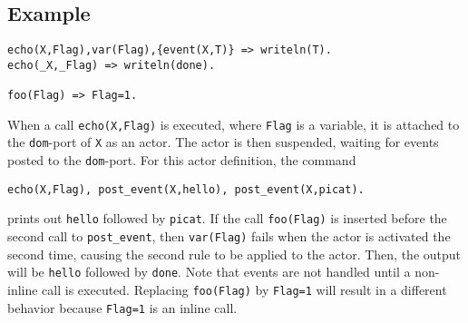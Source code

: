 \subsection*{Example}
\begin{verbatim}
echo(X,Flag),var(Flag),{event(X,T)} => writeln(T).
echo(_X,_Flag) => writeln(done).

foo(Flag) => Flag=1.
\end{verbatim}
When a call \texttt{echo(X,Flag)} is executed, where \texttt{Flag} is a variable, it is attached to the \texttt{dom}-port of \texttt{X} as an actor.  The actor is then suspended, waiting for events posted to the \texttt{dom}-port. For this actor definition, the command
\begin{small}
\begin{verbatim}
echo(X,Flag), post_event(X,hello), post_event(X,picat).
\end{verbatim}
\end{small}
prints out \texttt{hello} followed by \texttt{picat}. If the call \texttt{foo(Flag)} is inserted before the second call to \texttt{post\_event}, then \texttt{var(Flag)} fails when the actor is activated the second time, causing the second rule to be applied to the actor. Then, the output will be \texttt{hello} followed by \texttt{done}. Note that events are not handled until a non-inline call is executed. Replacing \texttt{foo(Flag)} by \texttt{Flag=1} will result in a different behavior because \texttt{Flag=1} is an inline call.

